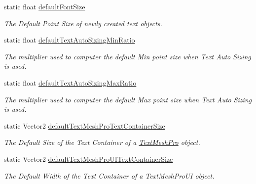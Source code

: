 \begin{DoxyCompactItemize}
static float \mbox{\hyperlink{class_t_m_pro_1_1_t_m_p___settings_abf4444c6d660f99777f99293b5d39f0e}{default\+Font\+Size}}
\begin{DoxyCompactList}\small\item\em The Default Point Size of newly created text objects. \end{DoxyCompactList}\item 
static float \mbox{\hyperlink{class_t_m_pro_1_1_t_m_p___settings_adcb2d6dfb662aae79cb47d5221744aee}{default\+Text\+Auto\+Sizing\+Min\+Ratio}}
\begin{DoxyCompactList}\small\item\em The multiplier used to computer the default Min point size when Text Auto Sizing is used. \end{DoxyCompactList}\item 
static float \mbox{\hyperlink{class_t_m_pro_1_1_t_m_p___settings_a154aa5b98a5f406081ee26df6365d1a5}{default\+Text\+Auto\+Sizing\+Max\+Ratio}}
\begin{DoxyCompactList}\small\item\em The multiplier used to computer the default Max point size when Text Auto Sizing is used. \end{DoxyCompactList}\item 
static Vector2 \mbox{\hyperlink{class_t_m_pro_1_1_t_m_p___settings_a2e8fbfcbda93f2c4b080d39d62363afc}{default\+Text\+Mesh\+Pro\+Text\+Container\+Size}}
\begin{DoxyCompactList}\small\item\em The Default Size of the Text Container of a \mbox{\hyperlink{class_t_m_pro_1_1_text_mesh_pro}{Text\+Mesh\+Pro}} object. \end{DoxyCompactList}\item 
static Vector2 \mbox{\hyperlink{class_t_m_pro_1_1_t_m_p___settings_a569c6d3b17242a88608906822f485ec6}{default\+Text\+Mesh\+Pro\+U\+I\+Text\+Container\+Size}}
\begin{DoxyCompactList}\small\item\em The Default Width of the Text Container of a Text\+Mesh\+Pro\+UI object. \end{DoxyCompactList}\item 

\end{DoxyCompactItemize}
